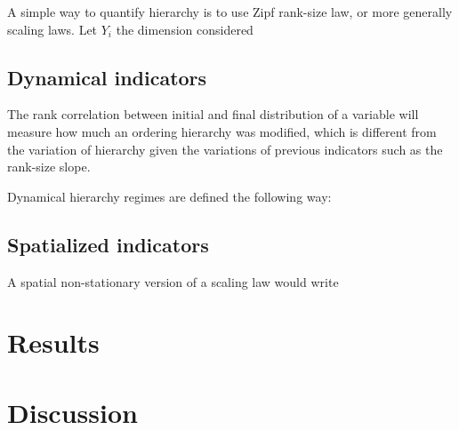 \documentclass[english,fleqn,allpages]{ISTE_science}[2018/07/30]
\begin{document}
A simple way to quantify hierarchy is to use Zipf rank-size law, or more generally scaling laws. Let $Y_i$ the dimension considered



\subsection{Dynamical indicators}

The rank correlation between initial and final distribution of a variable will measure how much an ordering hierarchy was modified, which is different from the variation of hierarchy given the variations of previous indicators such as the rank-size slope.

Dynamical hierarchy regimes are defined the following way: 


\subsection{Spatialized indicators}

A spatial non-stationary version of a scaling law would write




\section{Results}








\section{Discussion}



















\end{document}
